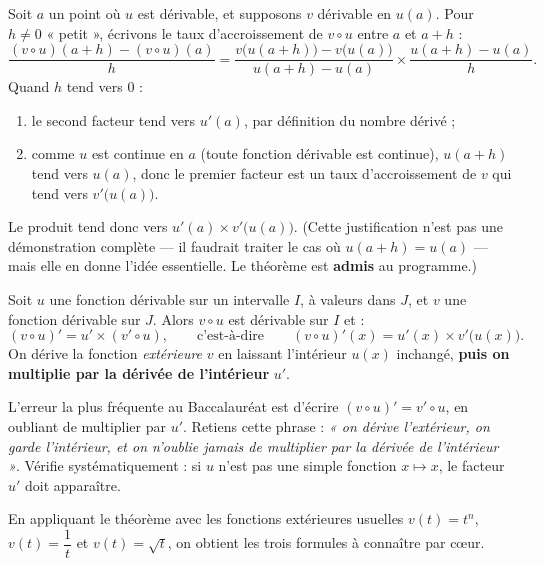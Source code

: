 \documentclass[11pt]{article}
\newcounter{popsec}
\newcounter{popsub}
\newcommand{\courssub}[1]{%
  \stepcounter{popsub}%
  \par\vspace{9pt}\noindent{\popxbold\fontsize{11.5}{13}\selectfont\color{popink}{\color{poporange}\thepopsec.\thepopsub}\hspace{6pt}#1}\par\nopagebreak\vspace{4pt}
}
\begin{document}
\begin{experience}
Soit $a$ un point où $u$ est dérivable, et supposons $v$ dérivable en $u(a)$. Pour $h \neq 0$ « petit », écrivons le taux d'accroissement de $v \circ u$ entre $a$ et $a + h$ :
\[ \frac{(v \circ u)(a+h) - (v \circ u)(a)}{h} = \frac{v\big(u(a+h)\big) - v\big(u(a)\big)}{u(a+h) - u(a)} \times \frac{u(a+h) - u(a)}{h}. \]
Quand $h$ tend vers $0$ :
\begin{enumerate}
\item le second facteur tend vers $u'(a)$, par définition du nombre dérivé ;
\item comme $u$ est continue en $a$ (toute fonction dérivable est continue), $u(a+h)$ tend vers $u(a)$, donc le premier facteur est un taux d'accroissement de $v$ qui tend vers $v'\big(u(a)\big)$.
\end{enumerate}
Le produit tend donc vers $u'(a) \times v'\big(u(a)\big)$. (Cette justification n'est pas une démonstration complète — il faudrait traiter le cas où $u(a+h) = u(a)$ — mais elle en donne l'idée essentielle. Le théorème est \textbf{admis} au programme.)
\end{experience}

\begin{propriete}
Soit $u$ une fonction dérivable sur un intervalle $I$, à valeurs dans $J$, et $v$ une fonction dérivable sur $J$. Alors $v \circ u$ est dérivable sur $I$ et :
\[ (v \circ u)' = u' \times (v' \circ u), \qquad \text{c'est-à-dire} \qquad (v \circ u)'(x) = u'(x) \times v'\big(u(x)\big). \]
On dérive la fonction \emph{extérieure} $v$ en laissant l'intérieur $u(x)$ inchangé, \textbf{puis on multiplie par la dérivée de l'intérieur} $u'$.
\end{propriete}

\begin{attention}
L'erreur la plus fréquente au Baccalauréat est d'écrire $(v \circ u)' = v' \circ u$, en oubliant de multiplier par $u'$. Retiens cette phrase : \emph{« on dérive l'extérieur, on garde l'intérieur, et on n'oublie jamais de multiplier par la dérivée de l'intérieur »}. Vérifie systématiquement : si $u$ n'est pas une simple fonction $x \mapsto x$, le facteur $u'$ doit apparaître.
\end{attention}

\courssub{Cas particuliers essentiels}

En appliquant le théorème avec les fonctions extérieures usuelles $v(t) = t^n$, $v(t) = \dfrac{1}{t}$ et $v(t) = \sqrt{t}$, on obtient les trois formules à connaître par cœur.
\end{document}
